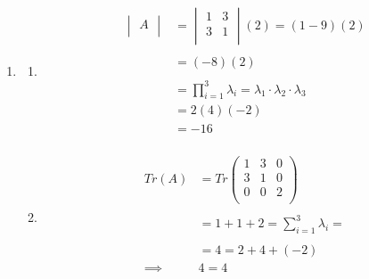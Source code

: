\documentclass[11pt,a4paper]{article}
\theoremstyle{definition}
\newtheorem{note}[thm]{Note}
\begin{document}
\begin{enumerate}
\begin{enumerate}
\begin{note}
\begin{align*}
\underline{e}_1 \cdot \underline{e}_2 & = 0 (1/\sqrt{2}) + 0(1/\sqrt{2}) + 1 (0) = 0\\
\underline{e}_1 \cdot \underline{e}_3 & = 0(1\sqrt{2})   + 0(-1/\sqrt{2}) + 1 (0) = 0\\
\underline{e}_2 \cdot \underline{e}_3 & = \frac{1}{\sqrt{2}}(1/\sqrt{2}) + \frac{1}{\sqrt{2}}(-1\sqrt{2}) + 0(0) = 0\\
\end{align*}
\end{note}



$$\implies \qquad  \underline{e}_1 \perp \underline{e}_2,  \underline{e}_1 \perp \underline{e}_3,  \underline{e}_2 \perp \underline{e}_3$$\\
\end{enumerate}



\item
\begin{enumerate}
      \item \begin{align*}
      \begin{vmatrix}
      A\\
      \end{vmatrix} & = \begin{vmatrix}
      1 & 3\\
      3 & 1\\
      \end{vmatrix}(2) = (1-9)(2)\\\\
      & = (-8)(2)\\\\
      & = \prod^3_{i=1}\lambda_i = \lambda_1 \cdot \lambda_2 \cdot \lambda_3\\
      & = 2(4)(-2)\\
      & = -16\\
      \end{align*}
      
      
      
      
\item \begin{align*}
Tr(A) & = Tr
\begin{pmatrix}
1 & 3 & 0\\
3 & 1 & 0\\
0 & 0 & 2\\
\end{pmatrix}\\\\
& = 1 + 1 + 2 = \sum^3_{i=1} \lambda_i = \\\\
& = 4 = 2 + 4 + (-2)\\
\implies \qquad  & 4  = 4\\\\
\end{align*}
\end{enumerate}
\end{enumerate}
\end{document}
